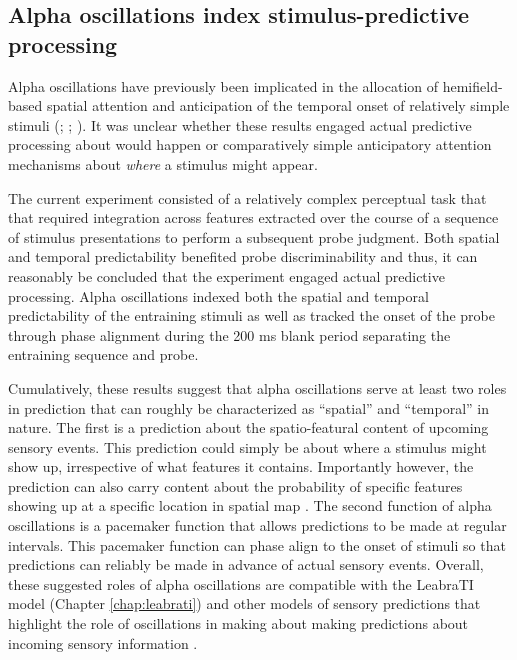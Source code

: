 \documentclass[dwyatte_dissertation.tex]{subfiles}
\begin{document}
\subsection{Alpha oscillations index stimulus-predictive processing}
Alpha oscillations have previously been implicated in the allocation of hemifield-based spatial attention and anticipation of the temporal onset of relatively simple stimuli (; ; ). It was unclear whether these results engaged actual predictive processing about  would happen or comparatively simple anticipatory attention mechanisms about \textit{where} a stimulus might appear. 

The current experiment consisted of a relatively complex perceptual task that that required integration across features extracted over the course of a sequence of stimulus presentations to perform a subsequent probe judgment. Both spatial and temporal predictability benefited probe discriminability and thus, it can reasonably be concluded that the experiment engaged actual predictive processing. Alpha oscillations indexed both the spatial and temporal predictability of the entraining stimuli as well as tracked the onset of the probe through phase alignment during the 200 ms blank period separating the entraining sequence and probe.

Cumulatively, these results suggest that alpha oscillations serve at least two roles in prediction that can roughly be characterized as ``spatial'' and ``temporal'' in nature. The first is a prediction about the spatio-featural content of upcoming sensory events. This prediction could simply be about where a stimulus might show up, irrespective of what features it contains. Importantly however, the prediction can also carry content about the probability of specific features showing up at a specific location in spatial map \cite{KokRahnevJeheeEtAl12,WyartNobreSummerfield12,HorschigJensenVanSchouwenburgEtAl13}. The second function of alpha oscillations is a pacemaker function that allows predictions to be made at regular intervals. This pacemaker function can phase align to the onset of stimuli \cite{SchroederLakatosKajikawaEtAl08,CalderoneLakatosButlerEtAlInPress} so that predictions can reliably be made in advance of actual sensory events. Overall, these suggested roles of alpha oscillations are compatible with the LeabraTI model (Chapter \ref{chap:leabrati}) and other models of sensory predictions that highlight the role of oscillations in making about making predictions about incoming sensory information \cite{ArnalGiraud12,GiraudPoeppel12}.

%
%
\end{document}
